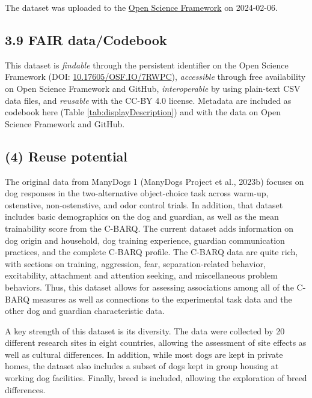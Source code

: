 \documentclass[
  man,floatsintext]{apa6}
\begin{document}
The dataset was uploaded to the \href{https://doi.org/10.17605/OSF.IO/7RWPC}{Open Science Framework} on 2024-02-06.

\hypertarget{fair-datacodebook}{%
\subsection{3.9 FAIR data/Codebook}\label{fair-datacodebook}}

This dataset is \emph{findable} through the persistent identifier on the Open Science Framework (DOI: \href{https://doi.org/10.17605/OSF.IO/7RWPC}{10.17605/OSF.IO/7RWPC}), \emph{accessible} through free availability on Open Science Framework and GitHub, \emph{interoperable} by using plain-text CSV data files, and \emph{reusable} with the CC-BY 4.0 license. Metadata are included as codebook here (Table \ref{tab:displayDescription}) and with the data on Open Science Framework and GitHub.

\hypertarget{reuse-potential}{%
\subsection{(4) Reuse potential}\label{reuse-potential}}

The original data from ManyDogs 1 (ManyDogs Project et al., 2023b) focuses on dog responses in the two-alternative object-choice task across warm-up, ostenstive, non-ostenstive, and odor control trials. In addition, that dataset includes basic demographics on the dog and guardian, as well as the mean trainability score from the C-BARQ. The current dataset adds information on dog origin and household, dog training experience, guardian communication practices, and the complete C-BARQ profile. The C-BARQ data are quite rich, with sections on training, aggression, fear, separation-related behavior, excitability, attachment and attention seeking, and miscellaneous problem behaviors. Thus, this dataset allows for assessing associations among all of the C-BARQ measures as well as connections to the experimental task data and the other dog and guardian characteristic data.

A key strength of this dataset is its diversity. The data were collected by 20 different research sites in eight countries, allowing the assessment of site effects as well as cultural differences. In addition, while most dogs are kept in private homes, the dataset also includes a subset of dogs kept in group housing at working dog facilities. Finally, breed is included, allowing the exploration of breed differences.
\end{document}
